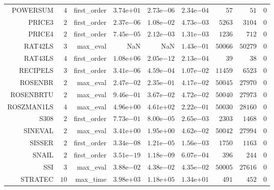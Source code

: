 \begin{longtable}{rrrrrrrrr}
POWERSUM & \(     4\) & first\_order & \( 3.74\)e\(+01\) & \( 2.73\)e\(-06\) & \( 2.34\)e\(-04\) & \(    57\) & \(    51\) & \(     0\) \\
PRICE3 & \(     2\) & first\_order & \( 2.37\)e\(-06\) & \( 1.08\)e\(-02\) & \( 4.73\)e\(-03\) & \(  5263\) & \(  3104\) & \(     0\) \\
PRICE4 & \(     2\) & first\_order & \( 7.45\)e\(-05\) & \( 2.12\)e\(-03\) & \( 1.31\)e\(-03\) & \(  1236\) & \(   712\) & \(     0\) \\
RAT42LS & \(     3\) & max\_eval &       NaN &       NaN & \( 1.43\)e\(-01\) & \( 50066\) & \( 50279\) & \(     0\) \\
RAT43LS & \(     4\) & first\_order & \( 1.08\)e\(+06\) & \( 2.05\)e\(-12\) & \( 2.13\)e\(-04\) & \(    39\) & \(    38\) & \(     0\) \\
RECIPELS & \(     3\) & first\_order & \( 3.41\)e\(-06\) & \( 4.59\)e\(-04\) & \( 1.07\)e\(-02\) & \( 11459\) & \(  6523\) & \(     0\) \\
ROSENBR & \(     2\) & max\_eval & \( 2.47\)e\(-02\) & \( 2.35\)e\(-01\) & \( 4.17\)e\(-02\) & \( 50045\) & \( 27970\) & \(     0\) \\
ROSENBRTU & \(     2\) & max\_eval & \( 9.46\)e\(-01\) & \( 3.67\)e\(-02\) & \( 4.72\)e\(-02\) & \( 50040\) & \( 27973\) & \(     0\) \\
ROSZMAN1LS & \(     4\) & max\_eval & \( 4.96\)e\(+00\) & \( 4.61\)e\(+02\) & \( 2.22\)e\(-01\) & \( 50030\) & \( 28160\) & \(     0\) \\
S308 & \(     2\) & first\_order & \( 7.73\)e\(-01\) & \( 8.00\)e\(-05\) & \( 2.65\)e\(-03\) & \(  2303\) & \(  1468\) & \(     0\) \\
SINEVAL & \(     2\) & max\_eval & \( 3.41\)e\(+00\) & \( 1.95\)e\(+00\) & \( 4.62\)e\(-02\) & \( 50042\) & \( 27994\) & \(     0\) \\
SISSER & \(     2\) & first\_order & \( 3.34\)e\(-08\) & \( 1.21\)e\(-05\) & \( 1.56\)e\(-03\) & \(  1750\) & \(  1163\) & \(     0\) \\
SNAIL & \(     2\) & first\_order & \( 3.51\)e\(-19\) & \( 1.18\)e\(-09\) & \( 6.07\)e\(-04\) & \(   396\) & \(   244\) & \(     0\) \\
SSI & \(     3\) & max\_eval & \( 3.88\)e\(-02\) & \( 4.38\)e\(-02\) & \( 4.35\)e\(-02\) & \( 50005\) & \( 27616\) & \(     0\) \\
STRATEC & \(    10\) & max\_time & \( 3.98\)e\(+03\) & \( 1.18\)e\(+05\) & \( 1.34\)e\(+01\) & \(   491\) & \(   452\) & \(     0\) \\

\end{longtable}
